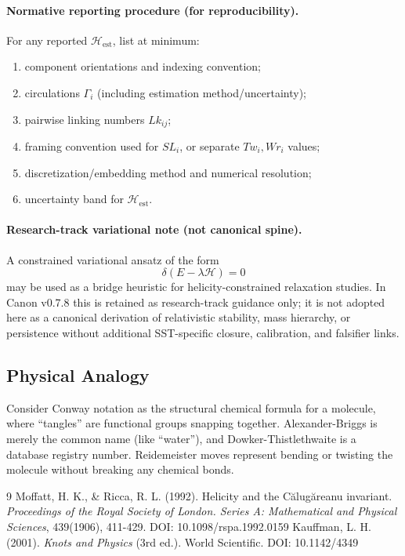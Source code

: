 \documentclass[10pt]{article}
\begin{document}
    \paragraph{Normative reporting procedure (for reproducibility).}
    For any reported \(\mathcal{H}_{\mathrm{est}}\), list at minimum:
    \begin{enumerate}
        \item component orientations and indexing convention;
        \item circulations \(\Gamma_i\) (including estimation method/uncertainty);
        \item pairwise linking numbers \(Lk_{ij}\);
        \item framing convention used for \(SL_i\), or separate \(Tw_i,Wr_i\) values;
        \item discretization/embedding method and numerical resolution;
        \item uncertainty band for \(\mathcal{H}_{\mathrm{est}}\).
    \end{enumerate}

    \paragraph{Research-track variational note (not canonical spine).}
    A constrained variational ansatz of the form
    \begin{equation}
        \delta\!\left(E-\lambda\mathcal{H}\right)=0
    \end{equation}
    may be used as a bridge heuristic for helicity-constrained relaxation studies. In Canon v0.7.8 this is retained as research-track guidance only; it is not adopted here as a canonical derivation of relativistic stability, mass hierarchy, or persistence without additional SST-specific closure, calibration, and falsifier links.

    \subsection{Physical Analogy}
        Consider Conway notation as the structural chemical formula for a molecule, where ``tangles'' are functional groups snapping together. Alexander-Briggs is merely the common name (like ``water''), and Dowker-Thistlethwaite is a database registry number. Reidemeister moves represent bending or twisting the molecule without breaking any chemical bonds.

        \begin{thebibliography}{9}
             Moffatt, H. K., \& Ricca, R. L. (1992). Helicity and the C\u{a}lug\u{a}reanu invariant. \textit{Proceedings of the Royal Society of London. Series A: Mathematical and Physical Sciences}, 439(1906), 411-429. DOI: 10.1098/rspa.1992.0159
             Kauffman, L. H. (2001). \textit{Knots and Physics} (3rd ed.). World Scientific. DOI: 10.1142/4349
        \end{thebibliography}
\end{document}

